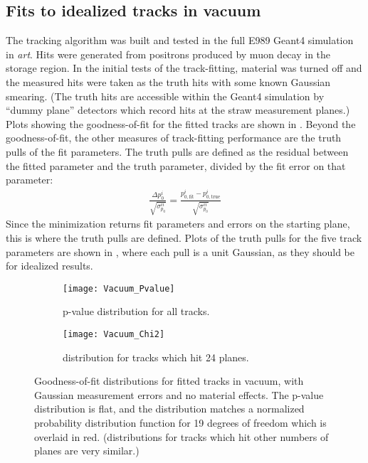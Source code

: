 \subsection{Fits to idealized tracks in vacuum}


The tracking algorithm was built and tested in the full E989 Geant4 simulation in \textit{art}. Hits were generated from positrons produced by muon decay in the storage region. In the initial tests of the track-fitting, material was turned off and the measured hits were taken as the truth hits with some known Gaussian smearing. (The truth hits are accessible within the Geant4 simulation by ``dummy plane'' detectors which record hits at the straw measurement planes.) Plots showing the goodness-of-fit for the fitted tracks are shown in . Beyond the goodness-of-fit, the other measures of track-fitting performance are the truth pulls of the fit parameters. The truth pulls are defined as the residual between the fitted parameter and the truth parameter, divided by the fit error on that parameter:
    \begin{align}
        \frac{\Delta p^{i}_{0}}{\sqrt{\sigma_{p_{0}}^{ii}}} = \frac{p^{i}_{0, \text{fit}} - p^{i}_{0, \text{true}}}{\sqrt{\sigma_{p_{0}}^{ii}}}
    \end{align}
Since the \chisq minimization returns fit parameters and errors on the starting plane, this is where the truth pulls are defined. Plots of the truth pulls for the five track parameters are shown in , where each pull is a unit Gaussian, as they should be for idealized results.



    \begin{figure}
    \centering
        \begin{subfigure}[t]{0.45\textwidth}
            \centering
            \texttt{[image: Vacuum\_Pvalue]}
            \caption{p-value distribution for all tracks.}
        \end{subfigure}
        \begin{subfigure}[t]{0.45\textwidth}
            \centering
            \texttt{[image: Vacuum\_Chi2]}
            \caption{\chisq distribution for tracks which hit 24 planes.}
        \end{subfigure}
    \caption[p-value and \chisq distribution for fitted tracks in vacuum]{Goodness-of-fit distributions for fitted tracks in vacuum, with Gaussian measurement errors and no material effects. The p-value distribution is flat, and the \chisq distribution matches a normalized \chisq probability distribution function for 19 degrees of freedom which is overlaid in red. (\chisq distributions for tracks which hit other numbers of planes are very similar.)}
    \label{fig:VacuumGoodnessOfFit}
    \end{figure}

